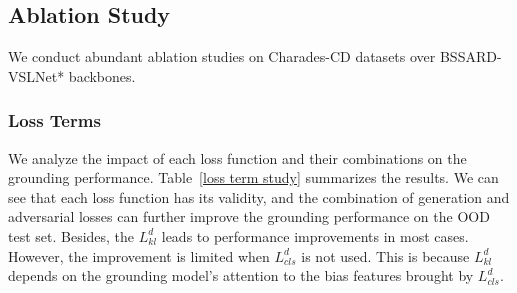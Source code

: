 \subsection{Ablation Study}

We conduct abundant ablation studies on Charades-CD datasets over BSSARD-VSLNet* backbones. 

\subsubsection{Loss Terms}

We analyze the impact of each loss function and their combinations on the grounding performance. Table~\ref{loss term study} summarizes the results. 
We can see that each loss function has its validity, and the combination of generation and adversarial losses can further improve the grounding performance on the OOD test set. 
Besides, the $L_{kl}^d$ leads to performance improvements in most cases. However, the improvement is limited when $L_{cls}^d$ is not used. This is because $L_{kl}^d$ depends on the grounding model's attention to the bias features brought by $L_{cls}^d$.


